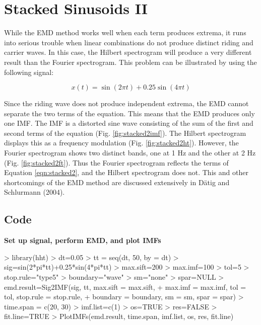 \documentclass[12pt]{article}
\begin{document}
\FloatBarrier


\section{Stacked Sinusoids II}

While the EMD method works well when each term produces extrema, it runs into serious trouble when linear combinations do not produce distinct riding and carrier waves.
In this case, the Hilbert spectrogram will produce a very different result than the Fourier spectrogram.
This problem can be illustrated by using the following signal:

\begin{equation}
\label{eqn:stacked2}
x(t) = \sin(2 \pi t) + 0.25\sin(4 \pi t)
\end{equation}

Since the riding wave does not produce independent extrema, the EMD cannot separate the two terms of the equation.
This means that the EMD produces only one IMF.
The IMF is a distorted sine wave consisting of the sum of the first and second terms of the equation (Fig. \ref{fig:stacked2imf}).
The Hilbert spectrogram displays this as a frequency modulation (Fig. \ref{fig:stacked2ht}).
However, the Fourier spectrogram shows two distinct bands, one at 1 Hz and the other at 2 Hz (Fig. \ref{fig:stacked2ft}).
Thus the Fourier spectrogram reflects the terms of Equation \ref{eqn:stacked2}, and the Hilbert spectrogram does not.
This and other shortcomings of the EMD method are discussed extensively in D\"{a}tig and Schlurmann (2004).

\subsection{Code}

\textbf{Set up signal, perform EMD, and plot IMFs}
\begin{Schunk}
\begin{Sinput}
> library(hht)
> dt=0.05
> tt = seq(dt, 50, by = dt)
> sig=sin(2*pi*tt)+0.25*sin(4*pi*tt)
> max.sift=200
> max.imf=100
> tol=5
> stop.rule="type5"
> boundary="wave"
> sm="none"
> spar=NULL
> emd.result=Sig2IMF(sig, tt, max.sift = max.sift,
+     max.imf = max.imf, tol = tol, stop.rule = stop.rule,
+     boundary = boundary, sm = sm, spar = spar)
> time.span = c(20, 30)
> imf.list=c(1)
> os=TRUE
> res=FALSE
> fit.line=TRUE
> PlotIMFs(emd.result, time.span, imf.list, os, res, fit.line)
\end{Sinput}
\end{Schunk}
\end{document}
